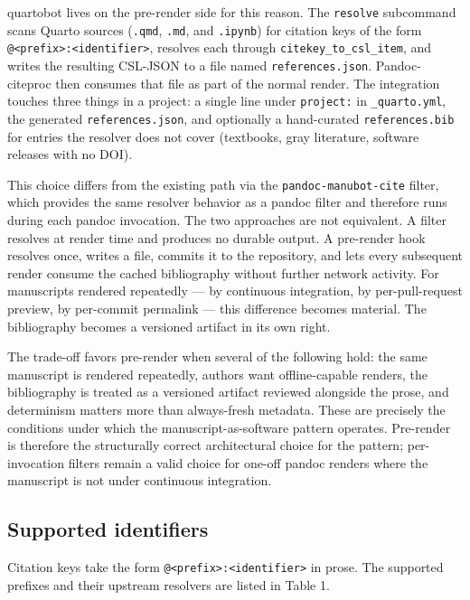 \documentclass[
  letterpaper,
  DIV=11,
  numbers=noendperiod]{scrartcl}
\begin{document}
quartobot lives on the pre-render side for this reason. The
\texttt{resolve} subcommand scans Quarto sources (\texttt{.qmd},
\texttt{.md}, and \texttt{.ipynb}) for citation keys of the form
\texttt{@\textless{}prefix\textgreater{}:\textless{}identifier\textgreater{}},
resolves each through \texttt{citekey\_to\_csl\_item}, and writes the
resulting CSL-JSON to a file named \texttt{references.json}.
Pandoc-citeproc then consumes that file as part of the normal render.
The integration touches three things in a project: a single line under
\texttt{project:} in \texttt{\_quarto.yml}, the generated
\texttt{references.json}, and optionally a hand-curated
\texttt{references.bib} for entries the resolver does not cover
(textbooks, gray literature, software releases with no DOI).

This choice differs from the existing path via the
\texttt{pandoc-manubot-cite} filter, which provides the same resolver
behavior as a pandoc filter and therefore runs during each pandoc
invocation. The two approaches are not equivalent. A filter resolves at
render time and produces no durable output. A pre-render hook resolves
once, writes a file, commits it to the repository, and lets every
subsequent render consume the cached bibliography without further
network activity. For manuscripts rendered repeatedly --- by continuous
integration, by per-pull-request preview, by per-commit permalink ---
this difference becomes material. The bibliography becomes a versioned
artifact in its own right.

The trade-off favors pre-render when several of the following hold: the
same manuscript is rendered repeatedly, authors want offline-capable
renders, the bibliography is treated as a versioned artifact reviewed
alongside the prose, and determinism matters more than always-fresh
metadata. These are precisely the conditions under which the
manuscript-as-software pattern operates. Pre-render is therefore the
structurally correct architectural choice for the pattern;
per-invocation filters remain a valid choice for one-off pandoc renders
where the manuscript is not under continuous integration.

\subsection{Supported identifiers}\label{supported-identifiers}

Citation keys take the form
\texttt{@\textless{}prefix\textgreater{}:\textless{}identifier\textgreater{}}
in prose. The supported prefixes and their upstream resolvers are listed
in Table 1.
\end{document}
